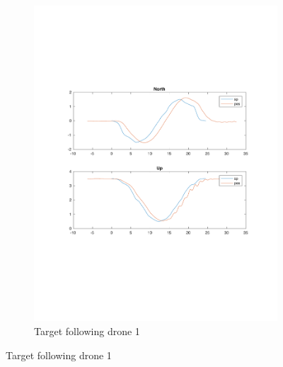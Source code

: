 \begin{figure}
\centering
   \begin{subfigure}[b]{0.8\textwidth}
   \includegraphics[width=1\linewidth]{chapters/chapter-04/figures/following_1.pdf}
   \caption{Target following drone 1}
   \label{fig:following_1}
\end{subfigure}


\end{figure}
